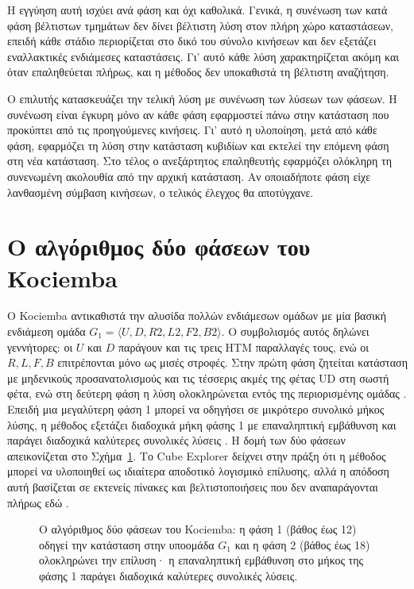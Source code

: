Η εγγύηση αυτή ισχύει ανά φάση και όχι καθολικά. Γενικά, η συνένωση των κατά φάση βέλτιστων τμημάτων δεν δίνει βέλτιστη λύση στον πλήρη χώρο καταστάσεων, επειδή κάθε στάδιο περιορίζεται στο δικό του σύνολο κινήσεων και δεν εξετάζει εναλλακτικές ενδιάμεσες καταστάσεις. Γι' αυτό κάθε λύση χαρακτηρίζεται  ακόμη και όταν επαληθεύεται πλήρως, και η μέθοδος δεν υποκαθιστά τη βέλτιστη αναζήτηση.

Ο επιλυτής κατασκευάζει την τελική λύση με συνένωση των λύσεων των φάσεων. Η συνένωση είναι έγκυρη μόνο αν κάθε φάση εφαρμοστεί πάνω στην κατάσταση που προκύπτει από τις προηγούμενες κινήσεις. Γι' αυτό η υλοποίηση, μετά από κάθε φάση, εφαρμόζει τη λύση στην κατάσταση κυβιδίων και εκτελεί την επόμενη φάση στη νέα κατάσταση. Στο τέλος ο ανεξάρτητος επαληθευτής εφαρμόζει ολόκληρη τη συνενωμένη ακολουθία από την αρχική κατάσταση. Αν οποιαδήποτε φάση είχε λανθασμένη σύμβαση κινήσεων, ο τελικός έλεγχος θα αποτύγχανε.

\section{Ο αλγόριθμος δύο φάσεων του Kociemba}
\label{sec:algorithms-kociemba}
Ο Kociemba αντικαθιστά την αλυσίδα πολλών ενδιάμεσων ομάδων με μία βασική ενδιάμεση ομάδα \(G_1=\langle U,D,R2,L2,F2,B2\rangle\). Ο συμβολισμός αυτός δηλώνει γεννήτορες: οι \(U\) και \(D\) παράγουν και τις τρεις HTM παραλλαγές τους, ενώ οι \(R,L,F,B\) επιτρέπονται μόνο ως μισές στροφές. Στην πρώτη φάση ζητείται κατάσταση με μηδενικούς προσανατολισμούς και τις τέσσερις ακμές της φέτας UD στη σωστή φέτα, ενώ στη δεύτερη φάση η λύση ολοκληρώνεται εντός της περιορισμένης ομάδας \cite{kociembaTwoPhase}. Επειδή μια μεγαλύτερη φάση 1 μπορεί να οδηγήσει σε μικρότερο συνολικό μήκος λύσης, η μέθοδος εξετάζει διαδοχικά μήκη φάσης 1 με επαναληπτική εμβάθυνση και παράγει διαδοχικά καλύτερες συνολικές λύσεις \cite{kociembaTwoPhase}. Η δομή των δύο φάσεων απεικονίζεται στο Σχήμα~\ref{fig:kociemba-twophase}. Το Cube Explorer δείχνει στην πράξη ότι η μέθοδος μπορεί να υλοποιηθεί ως ιδιαίτερα αποδοτικό λογισμικό επίλυσης, αλλά η απόδοση αυτή βασίζεται σε εκτενείς πίνακες και βελτιστοποιήσεις που δεν αναπαράγονται πλήρως εδώ \cite{kociembaCubeExplorer}.

\begin{figure}[htbp]\centering

\caption{Ο αλγόριθμος δύο φάσεων του Kociemba: η φάση 1 (βάθος έως 12) οδηγεί την κατάσταση στην υποομάδα \(G_1\) και η φάση 2 (βάθος έως 18) ολοκληρώνει την επίλυση· η επαναληπτική εμβάθυνση στο μήκος της φάσης 1 παράγει διαδοχικά καλύτερες συνολικές λύσεις.}
\label{fig:kociemba-twophase}
\end{figure}

